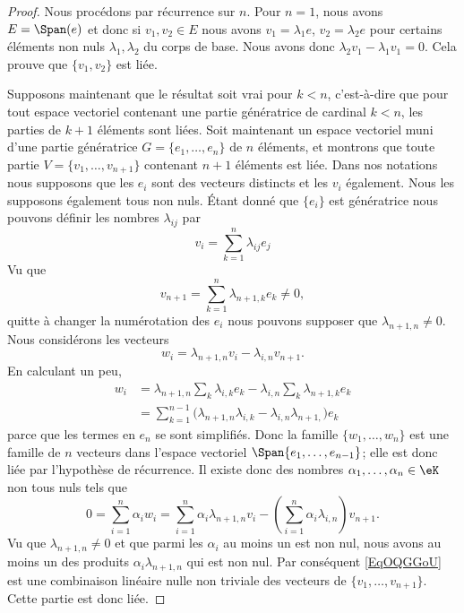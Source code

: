 \begin{proof}
    Nous procédons par récurrence sur \( n\). Pour \( n=1\), nous avons \( E=\Span(e)\) et donc si \( v_1,v_2\in E\) nous avons \( v_1=\lambda_1 e\), \( v_2=\lambda_2e\) pour certains éléments non nuls \( \lambda_1,\lambda_2\) du corps de base. Nous avons donc \( \lambda_2v_1-\lambda_1v_1=0\). Cela prouve que \( \{ v_1,v_2 \}\) est liée.

    Supposons maintenant que le résultat soit vrai pour \( k<n\), c'est-à-dire que pour tout espace vectoriel contenant une partie génératrice de cardinal \( k<n\), les parties de \( k+1\) éléments sont liées. Soit maintenant un espace vectoriel muni d'une partie génératrice \( G=\{ e_1,\ldots, e_n \}\) de \( n\) éléments, et montrons que toute partie \( V=\{ v_1,\ldots, v_{n+1} \}\) contenant \( n+1\) éléments est liée. Dans nos notations nous supposons que les \( e_i\) sont des vecteurs distincts et les \( v_i\) également. Nous les supposons également tous non nuls. Étant donné que \( \{ e_i \}\) est génératrice nous pouvons définir les nombres \( \lambda_{ij}\) par
    \begin{equation}
        v_i=\sum_{k=1}^n\lambda_{ij}e_j
    \end{equation}
    Vu que
    \begin{equation}
        v_{n+1}=\sum_{k=1}^n\lambda_{n+1,k}e_k\neq 0,
    \end{equation}
    quitte à changer la numérotation des \( e_i\) nous pouvons supposer que \( \lambda_{n+1,n}\neq 0\). Nous considérons les vecteurs
    \begin{equation}
        w_i=\lambda_{n+1,n}v_i-\lambda_{i,n}v_{n+1}.
    \end{equation}
    En calculant un peu,
    \begin{subequations}
        \begin{align}
            w_i&=\lambda_{n+1,n}\sum_k\lambda_{i,k}e_k-\lambda_{i,n}\sum_k\lambda_{n+1,k}e_k\\
            &=\sum_{k=1}^{n-1}\big( \lambda_{n+1,n}\lambda_{i,k}-\lambda_{i,n}\lambda_{n+1,} \big)e_k
        \end{align}
    \end{subequations}
    parce que les termes en \( e_n\) se sont simplifiés. Donc la famille \( \{ w_1,\ldots, w_n \}\) est une famille de \( n\) vecteurs dans l'espace vectoriel \( \Span\{ e_1,\ldots, e_{n-1} \}\); elle est donc liée par l'hypothèse de récurrence. Il existe donc des nombres \( \alpha_1,\ldots, \alpha_n\in \eK\) non tous nuls tels que
    \begin{equation}        \label{EqOQGGoU}
        0=\sum_{i=1}^n\alpha_iw_i=\sum_{i=1}^n\alpha_i\lambda_{n+1,n}v_i-\left( \sum_{i=1}^n\alpha_i\lambda_{i,n} \right)v_{n+1}.
    \end{equation}
    Vu que \( \lambda_{n+1,n}\neq 0\) et que parmi les \( \alpha_i\) au moins un est non nul, nous avons au moins un des produits \( \alpha_i\lambda_{n+1,n}\) qui est non nul. Par conséquent \eqref{EqOQGGoU} est une combinaison linéaire nulle non triviale des vecteurs de \( \{ v_1,\ldots, v_{n+1} \}\). Cette partie est donc liée.
\end{proof}

